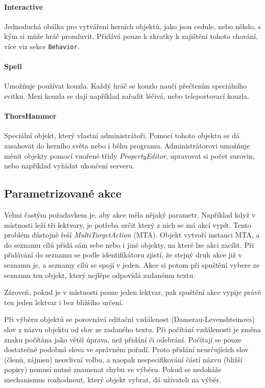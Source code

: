 \documentclass[11pt, a4paper]{article}
\def\class#1{\emph{#1}}
\begin{document}
\paragraph{Interactive} Jednoduchá obálka pro vytváření herních objektů, jako jsou cedule, nebo někdo, s kým si může hráč promluvit. Přidává pouze k zkratky k zajištění tohoto chování, více viz sekce \texttt{Behavior}.

\paragraph{Spell} Umožňuje používat kouzla. Každý hráč se kouzlo naučí přečtením speciálního svitku. Mezi kouzla se dají například zařadit léčivá, nebo teleportovací kouzla.

\paragraph{ThorsHammer} Speciální objekt, který vlastní administrátoři. Pomocí tohoto objektu se dá zasahovat do herního světa nebo i běhu programu. Administrátorovi umožňuje měnit objekty pomocí vnořené třídy \class{PropertyEditor}, upravovat si počet surovin, nebo například vyžádat ukončení serveru.

\subsection{Parametrizované akce}

Velmi častým požadavkem je, aby akce měla nějaký parametr. Například když v místnosti leží tři lektvary, je potřeba určit který z nich se má akcí vypít. Tento problém důstojně řeší \class{MultiTargetAction} (MTA). Objekt vytvoří instanci MTA, a do seznamu cílů přidá sám sebe nebo i jiné objekty, na které lze akci zacílit. Při přidávání do seznamu se podle identifikátoru zjistí, že stejný druh akce již v seznamu je, a seznamy cílů se spojí v jeden. Akce si potom při spuštění vybere ze seznamu ten objekt, který nejlépe odpovídá zadanému textu.

Zároveň, pokud je v místnosti pouze jeden lektvar, pak spuštění akce vypije právě ten jeden lektvar i bez bližšího určení.

Při výběru objektů se porovnává editační vzdálenost (Damerau-Levenshteinova) slov z názvu objektu od slov ze zadaného textu. Při počítání vzdálenosti je změna znaku počítána jako větší úprava, než přidání či odebrání. Počítají se pouze dostatečně podobná slova ve správném pořadí. Proto přidání neurčujících slov (členů, zájmen) neovlivní volbu, a naopak nespecifikování částí názvu (bližší popisy) nemusí nutně znamenat chybu ve výběru. Pokud se nedokáže mechanismus rozhodnout, který objekt vybrat, dá uživateli na výběr.
\end{document}
